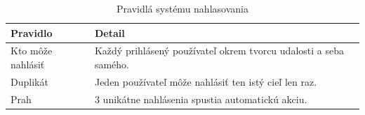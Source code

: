   \begin{table}[h]
      \centering                                                                                                                                                                                                                   
      \caption{Pravidlá systému nahlasovania}
      \label{tab:report-rules}
      \begin{tabular}{lp{8.5cm}}
          \toprule                                                                                                                                                                                                                 
          \textbf{Pravidlo} & \textbf{Detail} \\                                                                                                                                                                                   
          \midrule                                                                                                                                                                                                                 
          Kto môže nahlásiť &                                                                                                                                                                                                      
              Každý prihlásený používateľ okrem tvorcu udalosti
              a seba samého. \\                                                                                                                                                                                                    
          Duplikát &                                                                                                                                                                                                               
              Jeden používateľ môže nahlásiť ten istý cieľ len raz. \\                                                                                                                                                             
          Prah &                                                                                                                                                                                                                   
              3 unikátne nahlásenia spustia automatickú akciu. \\                                                                                                                                                                  

\end{tabular}
\end{table}
